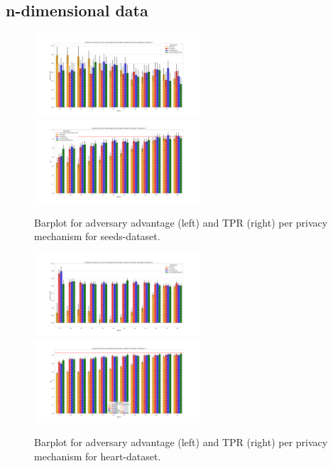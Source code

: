 \subsection{n-dimensional data}
\begin{figure}[H]
    \centering
    \begin{minipage}[c]{1.1\textwidth}
        \includegraphics[width=0.55\textwidth]{Results/RQ2-nd/seeds-dataset/shokri_mi_adv_seeds-dataset_comparison.png}
        \includegraphics[width=0.55\textwidth]{Results/RQ2-nd/seeds-dataset/tpr_seeds-dataset_comparison.png}
        \caption{Barplot for adversary advantage (left) and TPR (right) per privacy mechanism for seeds-dataset.}
        \label{fig:privacy_seeds-dataset_comparison_nd_aa_plot}
    \end{minipage}
    \begin{minipage}[c]{1.1\textwidth}
        \includegraphics[width=0.55\textwidth]{Results/RQ2-nd/heart-dataset/shokri_mi_adv_heart-dataset_comparison.png}
        \includegraphics[width=0.55\textwidth]{Results/RQ2-nd/heart-dataset/tpr_heart-dataset_comparison.png}
        \caption{Barplot for adversary advantage (left) and TPR (right) per privacy mechanism for heart-dataset.}
        \label{fig:privacy_heart-dataset_comparison_nd_aa_plot}
    \end{minipage}
\end{figure}


